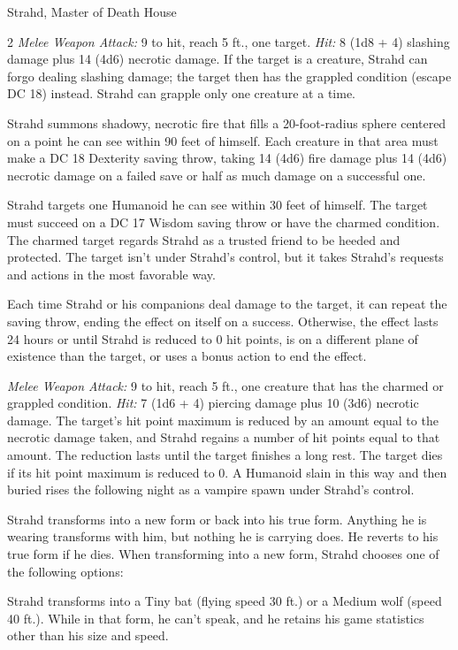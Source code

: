\documentclass[10pt,a4paper,twoside,bg=print,twocolumn,openany,nodeprecatedcode]{dndbook}
\begin{document}
\begin{DndMonster}[float*=b,width=\textwidth + 8pt]{Strahd, Master of Death House}
\begin{multicols}{2}
\textsl{Melee Weapon Attack:} 9 to hit, reach 5 ft., one target. \textsl{Hit:} 8 (1d8 + 4) slashing damage plus 14 (4d6) necrotic damage. If the target is a creature, Strahd can forgo dealing slashing damage; the target then has the grappled condition (escape DC 18) instead. Strahd can grapple only one creature at a time.

Strahd summons shadowy, necrotic fire that fills a 20-foot-radius sphere centered on a point he can see within 90 feet of himself. Each creature in that area must make a DC 18 Dexterity saving throw, taking 14 (4d6) fire damage plus 14 (4d6) necrotic damage on a failed save or half as much damage on a successful one.

Strahd targets one Humanoid he can see within 30 feet of himself. The target must succeed on a DC 17 Wisdom saving throw or have the charmed condition. The charmed target regards Strahd as a trusted friend to be heeded and protected. The target isn't under Strahd's control, but it takes Strahd's requests and actions in the most favorable way.

Each time Strahd or his companions deal damage to the target, it can repeat the saving throw, ending the effect on itself on a success. Otherwise, the effect lasts 24 hours or until Strahd is reduced to 0 hit points, is on a different plane of existence than the target, or uses a bonus action to end the effect.

\textsl{Melee Weapon Attack:} 9 to hit, reach 5 ft., one creature that has the charmed or grappled condition. \textsl{Hit:} 7 (1d6 + 4) piercing damage plus 10 (3d6) necrotic damage. The target's hit point maximum is reduced by an amount equal to the necrotic damage taken, and Strahd regains a number of hit points equal to that amount. The reduction lasts until the target finishes a long rest. The target dies if its hit point maximum is reduced to 0. A Humanoid slain in this way and then buried rises the following night as a vampire spawn under Strahd's control.

Strahd transforms into a new form or back into his true form. Anything he is wearing transforms with him, but nothing he is carrying does. He reverts to his true form if he dies. When transforming into a new form, Strahd chooses one of the following options:

Strahd transforms into a Tiny bat (flying speed 30 ft.) or a Medium wolf (speed 40 ft.). While in that form, he can't speak, and he retains his game statistics other than his size and speed.


\end{multicols}
\end{DndMonster}
\end{document}
